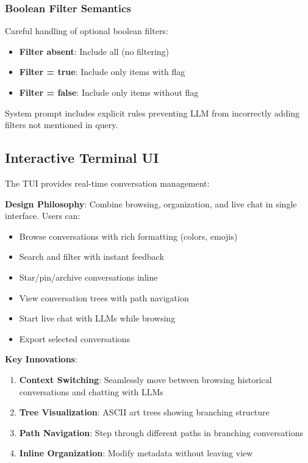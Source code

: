 \documentclass[11pt,letterpaper]{article}
\begin{document}
\subsubsection{Boolean Filter Semantics}

Careful handling of optional boolean filters:

\begin{itemize}
    \item \textbf{Filter absent}: Include all (no filtering)
    \item \textbf{Filter = true}: Include only items with flag
    \item \textbf{Filter = false}: Include only items without flag
\end{itemize}

System prompt includes explicit rules preventing LLM from incorrectly adding filters not mentioned in query.

\subsection{Interactive Terminal UI}

The TUI provides real-time conversation management:

\textbf{Design Philosophy}: Combine browsing, organization, and live chat in single interface. Users can:

\begin{itemize}
    \item Browse conversations with rich formatting (colors, emojis)
    \item Search and filter with instant feedback
    \item Star/pin/archive conversations inline
    \item View conversation trees with path navigation
    \item Start live chat with LLMs while browsing
    \item Export selected conversations
\end{itemize}

\textbf{Key Innovations}:

\begin{enumerate}
    \item \textbf{Context Switching}: Seamlessly move between browsing historical conversations and chatting with LLMs
    \item \textbf{Tree Visualization}: ASCII art trees showing branching structure
    \item \textbf{Path Navigation}: Step through different paths in branching conversations
    \item \textbf{Inline Organization}: Modify metadata without leaving view
\end{enumerate}
\end{document}
